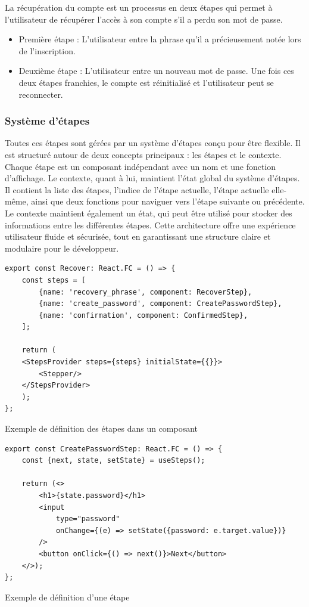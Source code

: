 La récupération du compte est un processus en deux étapes qui permet à l'utilisateur de récupérer l'accès à son compte s'il a perdu son mot de passe.

\begin{itemize}
    \item Première étape : L'utilisateur entre la phrase qu'il a précieusement notée lors de l'inscription.
    \item Deuxième étape : L'utilisateur entre un nouveau mot de passe. Une fois ces deux étapes franchies, le compte est réinitialisé et l'utilisateur peut se reconnecter.
\end{itemize}

\subsubsection{Système d'étapes}
Toutes ces étapes sont gérées par un système d'étapes conçu pour être flexible. Il est structuré autour de deux concepts principaux : les étapes et le contexte. Chaque étape est un composant indépendant avec un nom et une fonction d'affichage. Le contexte, quant à lui, maintient l'état global du système d'étapes. Il contient la liste des étapes, l'indice de l'étape actuelle, l'étape actuelle elle-même, ainsi que deux fonctions pour naviguer vers l'étape suivante ou précédente. Le contexte maintient également un état, qui peut être utilisé pour stocker des informations entre les différentes étapes. Cette architecture offre une expérience utilisateur fluide et sécurisée, tout en garantissant une structure claire et modulaire pour le développeur.

\begin{listing}[H]
    \begin{verbatim}
export const Recover: React.FC = () => {
    const steps = [
        {name: 'recovery_phrase', component: RecoverStep},
        {name: 'create_password', component: CreatePasswordStep},
        {name: 'confirmation', component: ConfirmedStep},
    ];

    return (
    <StepsProvider steps={steps} initialState={{}}>
        <Stepper/>
    </StepsProvider>
    );
};
  \end{verbatim}
    \caption{Exemple de définition des étapes dans un composant}
\end{listing}

\begin{listing}[H]
    \begin{verbatim}
export const CreatePasswordStep: React.FC = () => {
    const {next, state, setState} = useSteps();

    return (<>
        <h1>{state.password}</h1>
        <input 
            type="password" 
            onChange={(e) => setState({password: e.target.value})}
        />
        <button onClick={() => next()}>Next</button>
    </>);
};
  \end{verbatim}
    \caption{Exemple de définition d'une étape}
\end{listing}

